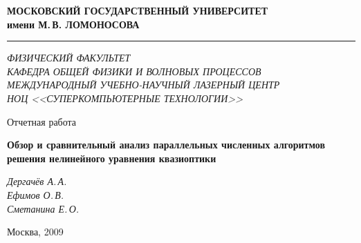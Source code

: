 \documentclass[12pt,a4paper]{article}
\begin{document}
    \hoffset=-2.54cm
    \voffset=-2.54cm
    \oddsidemargin=3.5cm
    \textwidth=16.5cm
    \topmargin=2.5cm
    \headheight=0cm
    \headsep=0cm
    \textheight=24.7cm
    	
    \newpage

    \thispagestyle{empty}

	\begin{center}
        \textbf{МОСКОВСКИЙ ГОСУДАРСТВЕННЫЙ УНИВЕРСИТЕТ \\ имени М.\,В. ЛОМОНОСОВА}\\
        \vspace{0.4em}
        \hrule

        \vspace{3em}

        \textit{
                ФИЗИЧЕСКИЙ {} ФАКУЛЬТЕТ \\
                \vspace{0.2em}
                КАФЕДРА {} ОБЩЕЙ {} ФИЗИКИ {} И {} ВОЛНОВЫХ {} ПРОЦЕССОВ \\
                \vspace{0.2em}
                МЕЖДУНАРОДНЫЙ {} УЧЕБНО-НАУЧНЫЙ {} ЛАЗЕРНЫЙ {} ЦЕНТР \\
                \vspace{0.2em}
                НОЦ {} <<СУПЕРКОМПЬЮТЕРНЫЕ ТЕХНОЛОГИИ>> \\
        }

        \vspace{8em}

        {\large Отчетная работа}
        \vspace{2em}

		{\Huge
			\textbf{Обзор и сравнительный анализ параллельных численных алгоритмов решения нелинейного уравнения квазиоптики
            \\
			}
		}
	\end{center}

    \vspace{8em}

    \begin{flushright}
        {\large
			\textit{Дергачёв А.\,А.\\Ефимов О.\,В.\\Сметанина Е.\,О.\\}
		}
    \end{flushright}

    \vfill

    \hfil Москва, 2009 \hfil

    \newpage
\end{document}
